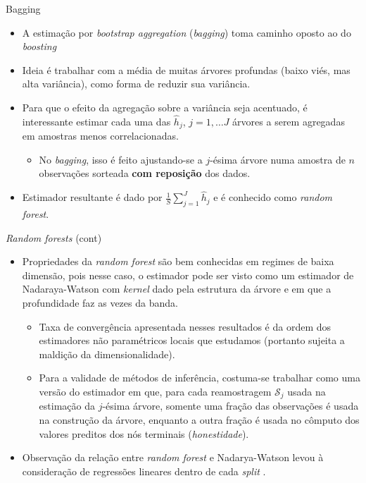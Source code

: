\documentclass[11pt]{beamer}
\begin{document}
\begin{frame}{Bagging}
\begin{itemize}
	\item A estimação por \textit{bootstrap aggregation}  (\textit{bagging}) toma caminho oposto ao do \textit{boosting}
	\item Ideia é trabalhar com a média de muitas árvores profundas (baixo viés, mas alta variância), como forma de reduzir sua variância.
	\item Para que o efeito da agregação sobre a variância seja acentuado, é interessante estimar cada uma das $\hat{h}_j$, $j=1,\ldots J$ árvores a serem agregadas em amostras menos correlacionadas.
	\begin{itemize}
		\item No \textit{bagging}, isso é feito ajustando-se a $j$-ésima árvore numa amostra de $n$ observações sorteada \textbf{com reposição} dos dados.
	\end{itemize}
			\item Estimador resultante é dado por $\frac{1}{S}\sum_{j=1}^J \hat{h}_j$ e é conhecido como \textit{random forest}.
			
\end{itemize}
\end{frame}

\begin{frame}{\textit{Random forests} (cont)}
	\begin{itemize}
			\item Propriedades da \textit{random forest} são bem conhecidas em regimes de baixa dimensão, pois nesse caso, o estimador pode ser visto como um estimador de Nadaraya-Watson com \textit{kernel} dado pela estrutura da árvore e em que a profundidade faz as vezes da banda.
		\begin{itemize}
			\item Taxa de convergência apresentada nesses resultados é da ordem dos estimadores não paramétricos locais que estudamos (portanto sujeita a maldição da dimensionalidade).
			\item Para a validade de métodos de inferência, costuma-se trabalhar como uma versão do estimador em que, para cada reamostragem $\mathcal{S}_j$ usada na estimação da $j$-ésima árvore, somente uma fração das observações é usada na construção da árvore, enquanto a outra fração é usada no cômputo dos valores preditos dos nós terminais (\textit{honestidade}).
		
		\end{itemize}
	 	\item Observação da relação entre \textit{random forest} e Nadarya-Watson levou à consideração de regressões lineares dentro de cada \textit{split} \citep{Friedberg2021}.
	
	\end{itemize}
\end{frame}
\end{document}
